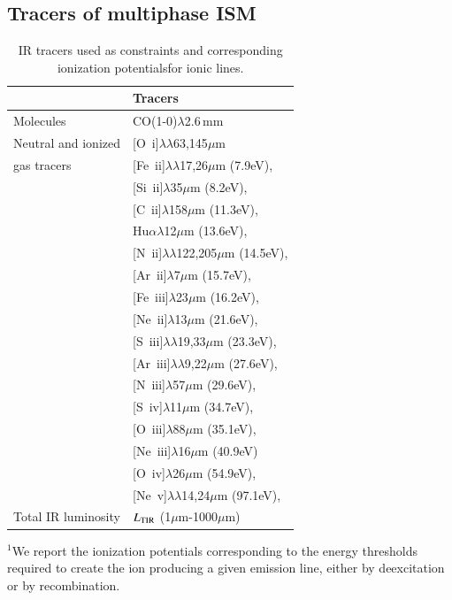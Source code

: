 \documentclass{aa}
\newcommand{\nii}{[N~{\sc ii}]}
\newcommand{\niii}{[N~{\sc iii}]}
\newcommand{\oi}{[O~{\sc i}]}
\newcommand{\oiii}{[O~{\sc iii}]}
\newcommand{\oiv}{[O~{\sc iv}]}
\newcommand{\siii}{[S~{\sc iii}]}
\newcommand{\siv}{[S~{\sc iv}]}
\newcommand{\cii}{[C~{\sc ii}]}
\newcommand{\neiii}{[Ne~{\sc iii}]}
\newcommand{\neii}{[Ne~{\sc ii}]}
\newcommand{\nev}{[Ne~{\sc v}]}
\newcommand{\feii}{[Fe~{\sc ii}]}
\newcommand{\feiii}{[Fe~{\sc iii}]}
\newcommand{\silii}{[Si~{\sc ii}]}
\newcommand{\arii}{[Ar~{\sc ii}]}
\newcommand{\ariii}{[Ar~{\sc iii}]}
\begin{document}
\subsection{Tracers of multiphase ISM}
\label{sect_tracer_ism}
\begin{table}[t]
    \centering
    \caption{IR tracers used as constraints and corresponding ionization potentials\protect\footnotemark[1] for ionic lines.}
    \begin{tabular}{p{}p{}}
         & Tracers \\
        \hline
        \hline
        Molecules & CO(1-0)$\lambda$2.6\,mm \\
        Neutral and ionized & \oi$\lambda\lambda$63,145$\mu$m\\
        gas tracers & \feii$\lambda\lambda$17,26$\mu$m (7.9eV), \\
         & \silii$\lambda$35$\mu$m (8.2eV),\\
         & \cii$\lambda$158$\mu$m (11.3eV),\\  
         & Hu$\alpha \lambda$12$\mu$m (13.6eV),\\
         & \nii$\lambda\lambda$122,205$\mu$m (14.5eV),\\
         & \arii$\lambda$7$\mu$m (15.7eV),\\
         & \feiii$\lambda$23$\mu$m (16.2eV),\\
         & \neii$\lambda$13$\mu$m (21.6eV),\\
         & \siii$\lambda\lambda$19,33$\mu$m (23.3eV),\\
         & \ariii$\lambda\lambda$9,22$\mu$m (27.6eV),\\
         & \niii$\lambda$57$\mu$m (29.6eV), \\
         & \siv$\lambda$11$\mu$m (34.7eV),\\
         & \oiii$\lambda$88$\mu$m (35.1eV), \\
         & \neiii$\lambda$16$\mu$m (40.9eV)\\
         &\oiv$\lambda$26$\mu$m (54.9eV),\\ 
         & \nev$\lambda\lambda$14,24$\mu$m (97.1eV), \\
         Total IR luminosity & $L_{\rm TIR}$ (1$\mu$m-1000$\mu$m) \\
         \hline
    \end{tabular}
    \begin{tablenotes}
    \footnotesize
    \item $^1$We report the ionization potentials corresponding to the energy thresholds required to create the ion producing a given emission line, either by deexcitation or by recombination.
    \end{tablenotes}
    \label{tracers}
\end{table}
\end{document}
